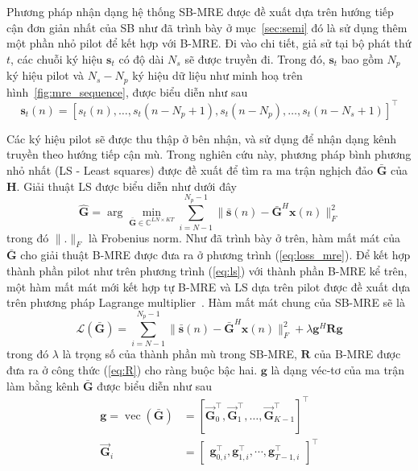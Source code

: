 Phương pháp nhận dạng hệ thống SB-MRE được đề xuất dựa trên hướng tiếp cận đơn giản nhất của SB như đã trình bày ở mục~\ref{sec:semi} đó là sử dụng thêm một phần nhỏ pilot để kết hợp với B-MRE. Đi vào chi tiết, giả sử tại bộ phát thứ $t$, các chuỗi ký hiệu $\mathbf{s}_t$ có độ dài $N_s$ sẽ được truyền đi. Trong đó, $\mathbf{s}_t$ bao gồm $N_p$ ký hiệu pilot và $N_s - N_p$ ký hiệu dữ liệu như minh hoạ trên hình~\ref{fig:mre_sequence}, được biểu diễn như sau
\begin{equation}
    \mathbf{s}_t(n) = [s_t(n), \ldots, s_t\left(n-N_{p} + 1\right),
    s_t\left(n - N_p\right), \ldots, s_t\left(n - N_s+1\right)]^\top
\end{equation}

Các ký hiệu pilot sẽ được thu thập ở bên nhận, và sử dụng để nhận dạng kênh truyền theo hướng tiếp cận mù. Trong nghiên cứu này, phương pháp bình phương nhỏ nhất (LS - Least squares) được đề xuất để tìm ra ma trận nghịch đảo $\bar{\mathbf{G}}$ của $\mathbf{H}$. Giải thuật LS được biểu diễn như dưới đây
\begin{equation}
\label{eq:ls}
    \hat{\mathbf{G}} = \arg \underset{\bar{\mathbf{G}} \in \mathbb{C}^{LN \times KT}}{\min} \sum_{i=N-1}^{N_{p} - 1}\|\bar{\mathbf{s}}(n)- \bar{\mathbf{G}}^H \mathbf{x}(n)\|_F^2 
\end{equation}
trong đó $\lVert . \rVert _F$ là Frobenius norm. Như đã trình bày ở trên, hàm mất mát của $\bar{\mathbf{G}}$ cho giải thuật B-MRE được đưa ra ở phương trình (\ref{eq:loss_mre}). Để kết hợp thành phần pilot như trên phương trình (\ref{eq:ls}) với thành phần B-MRE kể trên, một hàm mất mát mới kết hợp tự B-MRE và LS dựa trên pilot được đề xuất dựa trên phương pháp Lagrange multiplier~\cite{bertsekas2014constrained}. Hàm mất mát chung của SB-MRE sẽ là
\begin{equation}
\label{eq:cost}
    \mathcal{L}(\bar{\mathbf{G}})=\sum_{i=N-1}^{N_{p} - 1}\|\bar{\mathbf{s}}(n)- \bar{\mathbf{G}}^H \mathbf{x}(n)\|_F^2 +\lambda \mathbf{g}^H \mathbf{R} \mathbf{g}
\end{equation}
trong đó $\lambda$ là trọng số của thành phần mù trong SB-MRE, $\mathbf{R}$ của B-MRE được đưa ra ở công thức (\ref{eq:R}) cho ràng buộc bậc hai. $\mathbf{g}$ là dạng véc-tơ của ma trận làm bằng kênh $\bar{\mathbf{G}}$ được biểu diễn như sau
\begin{equation}
\label{eq:vecG}
    \begin{aligned}
        \mathbf{g} = \operatorname{vec}(\bar{\mathbf{G}}) &=\left[\vec{\mathbf{G}}_0^\top, \vec{\mathbf{G}}_1^\top, \ldots, \vec{\mathbf{G}}_{K-1}^\top\right]^\top \\
        \vec{\mathbf{G}}_i &= \left[\begin{array}{ll}
        \mathbf{g}_{0, i}^\top, \mathbf{g}_{1, i}^\top, \cdots, \mathbf{g}_{T-1, i}^\top
        \end{array}\right]^\top
    \end{aligned}
\end{equation}

